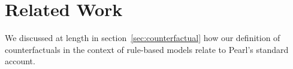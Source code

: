 
\section{Related Work}

We discussed at length in section~\ref{sec:counterfactual} how our
definition of counterfactuals in the context of rule-based models
relate to Pearl's standard account\cite{pearl2009causality}.
